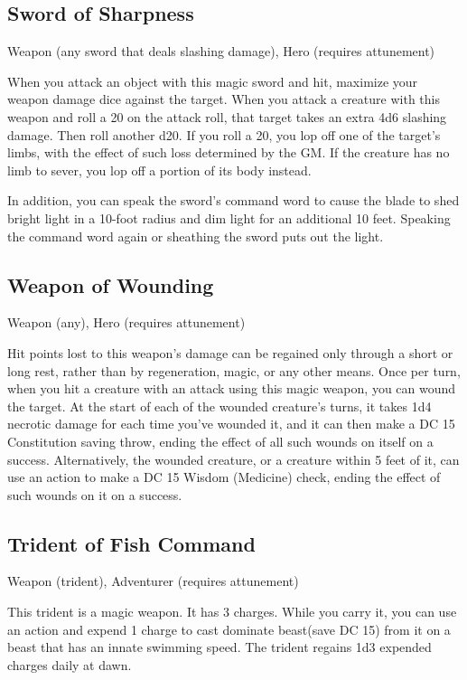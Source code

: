 \subsection{Sword of Sharpness}
Weapon (any sword that deals slashing damage), Hero (requires attunement)

When you attack an object with this magic sword and hit, maximize your weapon damage dice against the target.
When you attack a creature with this weapon and roll a 20 on the attack roll, that target takes an extra 4d6 slashing damage. Then roll another d20. If you roll a 20, you lop off one of the target's limbs, with the effect of such loss determined by the GM. If the creature has no limb to sever, you lop off a portion of its body instead.

In addition, you can speak the sword's command word to cause the blade to shed bright light in a 10-foot radius and dim light for an additional 10 feet. Speaking the command word again or sheathing the sword puts out the light.

\subsection{Weapon of Wounding}
Weapon (any), Hero (requires attunement)

Hit points lost to this weapon's damage can be regained only through a short or long rest, rather than by regeneration, magic, or any other means.
Once per turn, when you hit a creature with an attack using this magic weapon, you can wound the target. At the start of each of the wounded creature's turns, it takes 1d4 necrotic damage for each time you've wounded it, and it can then make a DC 15 Constitution saving throw, ending the effect of all such wounds on itself on a success. Alternatively, the wounded creature, or a creature within 5 feet of it, can use an action to make a DC 15 Wisdom (Medicine) check, ending the effect of such wounds on it on a success.

\subsection{Trident of Fish Command}
Weapon (trident), Adventurer (requires attunement)

This trident is a magic weapon. It has 3 charges. While you carry it, you can use an action and expend 1 charge to cast
dominate beast(save DC 15) from it on a beast that has an innate swimming speed. The trident regains 1d3 expended charges daily at dawn.

